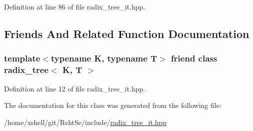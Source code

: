 Definition at line 86 of file radix\+\_\+tree\+\_\+it.\+hpp.



\subsection{Friends And Related Function Documentation}
\subsubsection[{\texorpdfstring{radix\+\_\+tree$<$ K, T $>$}{radix_tree< K, T >}}]{\setlength{\rightskip}{0pt plus 5cm}template$<$typename K, typename T$>$ friend class {\bf radix\+\_\+tree}$<$ K, T $>$\hspace{0.3cm}{\ttfamily [friend]}}\hypertarget{classradix__tree__it_a0596aeb27884e8ff44f365527f6a8f12}{}\label{classradix__tree__it_a0596aeb27884e8ff44f365527f6a8f12}


Definition at line 12 of file radix\+\_\+tree\+\_\+it.\+hpp.



The documentation for this class was generated from the following file\+:\begin{DoxyCompactItemize}
\item 
/home/xshell/git/\+Reht\+Se/include/\hyperlink{radix__tree__it_8hpp}{radix\+\_\+tree\+\_\+it.\+hpp}\end{DoxyCompactItemize}
